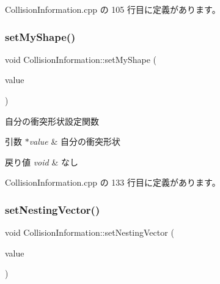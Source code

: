  Collision\+Information.\+cpp の 105 行目に定義があります。

\mbox{\label{class_collision_information_ad29cf44e98f3adde478d77a6887ba6ef}} 
\subsubsection{\texorpdfstring{set\+My\+Shape()}{setMyShape()}}
{\footnotesize\ttfamily void Collision\+Information\+::set\+My\+Shape (\begin{DoxyParamCaption}\item[{\mbox{\hyperlink{class_collision_object_1_1_shape}{Collision\+Object\+::\+Shape}} $\ast$}]{value }\end{DoxyParamCaption})}



自分の衝突形状設定関数 


\begin{DoxyParams}{引数}
{\em $\ast$value} & 自分の衝突形状 \\
\hline
\end{DoxyParams}

\begin{DoxyRetVals}{戻り値}
{\em void} & なし \\
\hline
\end{DoxyRetVals}


 Collision\+Information.\+cpp の 133 行目に定義があります。

\mbox{\label{class_collision_information_ad0233e1e4f322e3209d8a74c10d142c8}} 
\subsubsection{\texorpdfstring{set\+Nesting\+Vector()}{setNestingVector()}}
{\footnotesize\ttfamily void Collision\+Information\+::set\+Nesting\+Vector (\begin{DoxyParamCaption}\item[{\mbox{\hyperlink{class_vector3_d}{Vector3D}}}]{value }\end{DoxyParamCaption})}



